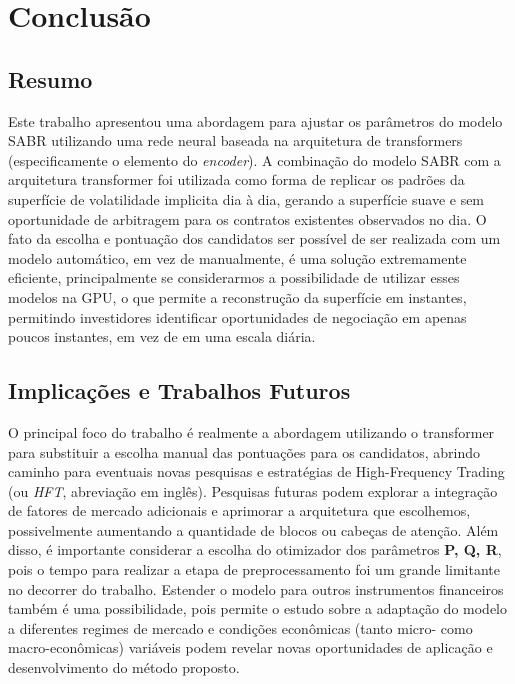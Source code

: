 \section{Conclusão}
\subsection{Resumo}

Este trabalho apresentou uma abordagem para ajustar os parâmetros do modelo SABR utilizando uma rede neural baseada na arquitetura de transformers (especificamente o elemento do \textit{encoder}). A combinação do modelo SABR com a arquitetura transformer foi utilizada como forma de replicar os padrões da superfície de volatilidade implicita dia à dia, gerando a superfície suave e sem oportunidade de arbitragem para os contratos existentes observados no dia. O fato da escolha e pontuação dos candidatos ser possível de ser realizada com um modelo automático, em vez de manualmente, é uma solução extremamente eficiente, principalmente se considerarmos a possibilidade de utilizar esses modelos na GPU, o que permite a reconstrução da superfície em instantes, permitindo investidores identificar oportunidades de negociação em apenas poucos instantes, em vez de em uma escala diária.

\subsection{Implicações e Trabalhos Futuros}

O principal foco do trabalho é realmente a abordagem utilizando o transformer para substituir a escolha manual das pontuações para os candidatos, abrindo caminho para eventuais novas pesquisas e estratégias de High-Frequency Trading (ou \textit{HFT}, abreviação em inglês). Pesquisas futuras podem explorar a integração de fatores de mercado adicionais e aprimorar a arquitetura que escolhemos, possivelmente aumentando a quantidade de blocos ou cabeças de atenção. Além disso, é importante considerar a escolha do otimizador dos parâmetros \textbf{P, Q, R}, pois o tempo para realizar a etapa de preprocessamento foi um grande limitante no decorrer do trabalho. Estender o modelo para outros instrumentos financeiros também é uma possibilidade, pois permite o estudo sobre a adaptação do modelo a diferentes regimes de mercado e condições econômicas (tanto micro- como macro-econômicas) variáveis podem revelar novas oportunidades de aplicação e desenvolvimento do método proposto.


